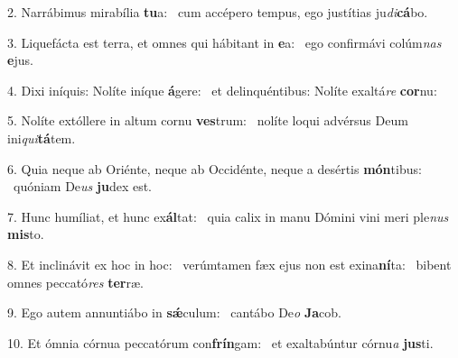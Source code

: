 2. Narrábimus mirabília \textbf{tu}a: \ast\  cum accépero tempus, ego justítias ju\textit{di}\textbf{cá}bo.\

3. Liquefácta est terra, et omnes qui hábitant in \textbf{e}a: \ast\  ego confirmávi colúm\textit{nas} \textbf{e}jus.\

4. Dixi iníquis: Nolíte iníque \textbf{á}gere: \ast\  et delinquéntibus: Nolíte exaltá\textit{re} \textbf{cor}nu:\

5. Nolíte extóllere in altum cornu \textbf{ves}trum: \ast\  nolíte loqui advérsus Deum ini\textit{qui}\textbf{tá}tem.\

6. Quia neque ab Oriénte, neque ab Occidénte, neque a desértis \textbf{món}tibus: \ast\  quóniam De\textit{us} \textbf{ju}dex est.\

7. Hunc humíliat, et hunc ex\textbf{ál}tat: \ast\  quia calix in manu Dómini vini meri ple\textit{nus} \textbf{mis}to.\

8. Et inclinávit ex hoc in hoc: \dag\  verúmtamen fæx ejus non est exina\textbf{ní}ta: \ast\  bibent omnes peccató\textit{res} \textbf{ter}ræ.\

9. Ego autem annuntiábo in \textbf{sǽ}culum: \ast\  cantábo De\textit{o} \textbf{Ja}cob.\

10. Et ómnia córnua peccatórum con\textbf{frín}gam: \ast\  et exaltabúntur córnu\textit{a} \textbf{jus}ti.\

